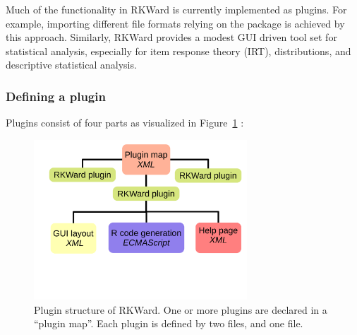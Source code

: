 Much of the functionality in RKWard is currently implemented as plugins. For example, importing different file
formats relying on the  package is achieved by this approach. Similarly,
RKWard provides a modest GUI driven tool set for statistical analysis,
especially for item response theory (IRT), distributions, and descriptive
statistical analysis.

\subsubsection{Defining a plugin}
\label{sec:technical_plugins_defining}
Plugins consist of four parts as visualized in Figure~\ref{fig:plugin_structure} 
\citep[see Section~\ref{sec:example_plugin} for an example; for a complete
manual, see][]{Friedrichsmeier2010}:

\begin{figure}[htp]
 \centering
 \includegraphics[width=8cm]{../figures/plugin_structure.pdf}
 \caption{Plugin structure of RKWard. One or more plugins are declared in a ``plugin map''. Each plugin is defined by
 two  files, and one  file.}
 \label{fig:plugin_structure}
\end{figure}

